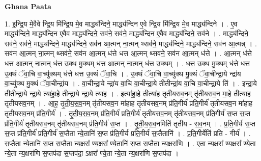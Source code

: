 \documentclass[17pt]{extarticle}
\begin{document}
\textbf{Ghana Paata } \newline

1. इ॒न्द्रि॒य मे॒वैवे न्द्रि॒य मि॑न्द्रि॒य मे॒व माद्ध्य॑न्दिने॒ माद्ध्य॑न्दिन ए॒वे न्द्रि॒य मि॑न्द्रि॒य मे॒व माद्ध्य॑न्दिने । . ए॒व माद्ध्य॑न्दिने॒ माद्ध्य॑न्दिन ए॒वैव माद्ध्य॑न्दिने॒ सव॑ने॒ सव॑ने॒ माद्ध्य॑न्दिन ए॒वैव माद्ध्य॑न्दिने॒ सव॑ने । . माद्ध्य॑न्दिने॒ सव॑ने॒ सव॑ने॒ माद्ध्य॑न्दिने॒ माद्ध्य॑न्दिने॒ सव॑न आ॒त्मन् ना॒त्मन् थ्सव॑ने॒ माद्ध्य॑न्दिने॒ माद्ध्य॑न्दिने॒ सव॑न आ॒त्मन्न् । . सव॑न आ॒त्मन् ना॒त्मन् थ्सव॑ने॒ सव॑न आ॒त्मन् ध॑त्ते धत्त आ॒त्मन् थ्सव॑ने॒ सव॑न आ॒त्मन् ध॑त्ते । . आ॒त्मन् ध॑त्ते धत्त आ॒त्मन् ना॒त्मन् ध॑त्त उ॒क्थ मु॒क्थम् ध॑त्त आ॒त्मन् ना॒त्मन् ध॑त्त उ॒क्थम् । . ध॒त्त॒ उ॒क्थ मु॒क्थम् ध॑त्ते धत्त उ॒क्थं ॅवा॒चि वा॒च्यु॑क्थम् ध॑त्ते धत्त उ॒क्थं ॅवा॒चि । . उ॒क्थं ॅवा॒चि वा॒च्यु॑क्थ मु॒क्थं ॅवा॒चीन्द्रा॒ये न्द्रा॑य वा॒च्यु॑क्थ मु॒क्थं ॅवा॒चीन्द्रा॑य । . वा॒चीन्द्रा॒ये न्द्रा॑य वा॒चि वा॒चीन्द्रा॒ये तीतीन्द्रा॑य वा॒चि वा॒चीन्द्रा॒ये ति॑ । . इन्द्रा॒ये तीतीन्द्रा॒ये न्द्रा॒ये त्या॑हा॒हे तीन्द्रा॒ये न्द्रा॒ये त्या॑ह । . इत्या॑हा॒हे तीत्या॑ह तृतीयसव॒नम् तृ॑तीयसव॒न मा॒हे तीत्या॑ह तृतीयसव॒नम् । . आ॒ह॒ तृ॒ती॒य॒स॒व॒नम् तृ॑तीयसव॒न मा॑हाह तृतीयसव॒नम् प्र॑ति॒गीर्य॑ प्रति॒गीर्य॑ तृतीयसव॒न मा॑हाह तृतीयसव॒नम् प्र॑ति॒गीर्य॑ । . तृ॒ती॒य॒स॒व॒नम् प्र॑ति॒गीर्य॑ प्रति॒गीर्य॑ तृतीयसव॒नम् तृ॑तीयसव॒नम् प्र॑ति॒गीर्य॑ स॒प्त स॒प्त प्र॑ति॒गीर्य॑ तृतीयसव॒नम् तृ॑तीयसव॒नम् प्र॑ति॒गीर्य॑ स॒प्त । . तृ॒ती॒य॒स॒व॒नमिति॑ तृतीय - स॒व॒नम् । . प्र॒ति॒गीर्य॑ स॒प्त स॒प्त प्र॑ति॒गीर्य॑ प्रति॒गीर्य॑ स॒प्तैता न्ये॒तानि॑ स॒प्त प्र॑ति॒गीर्य॑ प्रति॒गीर्य॑ स॒प्तैतानि॑ । . प्र॒ति॒गीर्येति॑ प्रति - गीर्य॑ । . स॒प्तैता न्ये॒तानि॑ स॒प्त स॒प्तैता न्य॒क्षरा᳚ ण्य॒क्षरा᳚ ण्ये॒तानि॑ स॒प्त स॒प्तैता न्य॒क्षरा॑णि । . ए॒ता न्य॒क्षरा᳚ ण्य॒क्षरा᳚ ण्ये॒ता न्ये॒ता न्य॒क्षरा॑णि स॒प्तप॑दा 
स॒प्तप॑दा॒ ऽक्षरा᳚ ण्ये॒ता न्ये॒ता न्य॒क्षरा॑णि स॒प्तप॑दा । \newline
\end{document}
